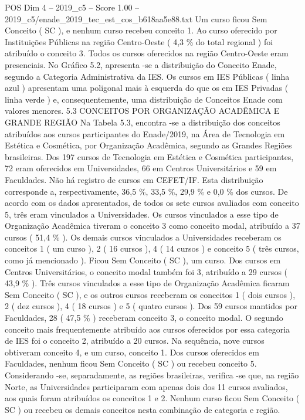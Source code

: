 \begin{textsample}{POS Dim 4 – 2019\_c5 – Score 1.00 – 2019\_c5/enade\_2019\_tec\_est\_cos\_b618aa5e88.txt}
Um curso ficou Sem Conceito ( SC ), e nenhum curso recebeu conceito 1.
Ao curso oferecido por Instituições Públicas na região Centro-Oeste ( 4,3 \% do total regional ) foi atribuído o conceito 3.
Todos os cursos oferecidos na região Centro-Oeste eram presenciais.
No Gráfico 5.2, apresenta -se a distribuição do Conceito Enade, segundo a Categoria Administrativa da IES.
Os cursos em IES Públicas ( linha azul ) apresentam uma poligonal mais à esquerda do que os em IES Privadas ( linha verde ) e, consequentemente, uma distribuição de Conceitos Enade com valores menores. 5.3 CONCEITOS POR ORGANIZAÇÃO ACADÊMICA E GRANDE REGIÃO Na Tabela 5.3, encontra -se a distribuição dos conceitos atribuídos aos cursos participantes do Enade/2019, na Área de Tecnologia em Estética e Cosmética, por Organização Acadêmica, segundo as Grandes Regiões brasileiras.
Dos 197 cursos de Tecnologia em Estética e Cosmética participantes, 72 eram oferecidos em Universidades, 66 em Centros Universitários e 59 em Faculdades.
Não há registro de cursos em CEFET/IF.
Esta distribuição corresponde a, respectivamente, 36,5 \%, 33,5 \%, 29,9 \% e 0,0 \% dos cursos.
De acordo com os dados apresentados, de todos os sete cursos avaliados com conceito 5, três eram vinculados a Universidades.
Os cursos vinculados a esse tipo de Organização Acadêmica tiveram o conceito 3 como conceito modal, atribuído a 37 cursos ( 51,4 \% ).
Os demais cursos vinculados a Universidades receberam os conceitos 1 ( um curso ), 2 ( 16 cursos ), 4 ( 14 cursos ) e conceito 5 ( três cursos, como já mencionado ).
Ficou Sem Conceito ( SC ), um curso.
Dos cursos em Centros Universitários, o conceito modal também foi 3, atribuído a 29 cursos ( 43,9 \% ).
Três cursos vinculados a esse tipo de Organização Acadêmica ficaram Sem Conceito ( SC ), e os outros cursos receberam os conceitos 1 ( dois cursos ), 2 ( dez cursos ), 4 ( 18 cursos ) e 5 ( quatro cursos ).
Dos 59 cursos mantidos por Faculdades, 28 ( 47,5 \% ) receberam conceito 3, o conceito modal.
O segundo conceito mais frequentemente atribuído aos cursos oferecidos por essa categoria de IES foi o conceito 2, atribuído a 20 cursos.
Na sequência, nove cursos obtiveram conceito 4, e um curso, conceito 1.
Dos cursos oferecidos em Faculdades, nenhum ficou Sem Conceito ( SC ) ou recebeu conceito 5.
Considerando -se, separadamente, as regiões brasileiras, verifica -se que, na região Norte, as Universidades participaram com apenas dois dos 11 cursos avaliados, aos quais foram atribuídos os conceitos 1 e 2.
Nenhum curso ficou Sem Conceito ( SC ) ou recebeu os demais conceitos nesta combinação de categoria e região.

\end{textsample}
